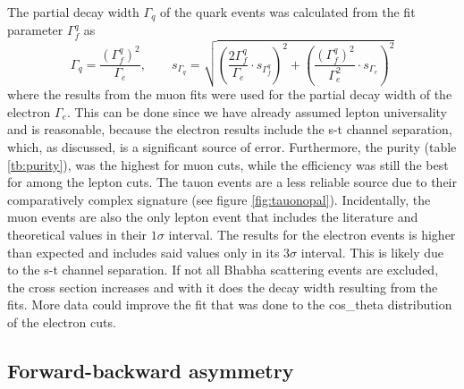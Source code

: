 The partial decay width $\Gamma_q$ of the quark events was calculated from the fit parameter $\Gamma_f^q$ as
\begin{equation}
\Gamma_q=\frac{(\Gamma_{f}^q)^2}{\Gamma_e},\qquad
s_{\Gamma_q}=\sqrt{\left(\frac{2\Gamma_f^q}{\Gamma_e}\cdot s_{\Gamma_f^q}\right)^2+\left(\frac{(\Gamma_f^q)^2}{\Gamma_e^2}\cdot s_{\Gamma_e}\right)^2}
\end{equation}
where the results from the muon fits were used for the partial decay width of the electron $\Gamma_e$. This can be done since we have already assumed lepton universality and is reasonable, because the electron results include the s-t channel separation, which, as discussed, is a significant source of error. Furthermore, the purity (table \ref{tb:purity}), was the highest for muon cuts, while the efficiency was still the best for among the lepton cuts. The tauon events are a less reliable source due to their comparatively complex signature (see figure \ref{fig:tauonopal}). 
Incidentally, the muon events are also the only lepton event that includes the literature and theoretical values in their $1\sigma$ interval. The results for the electron events is higher than expected and includes said values only in its $3\sigma$ interval. This is likely due to the s-t channel separation. If not all Bhabha scattering events are excluded, the cross section increases and with it does the decay width resulting from the fits. More data could improve the fit that was done to the cos\_theta distribution of the electron cuts. 

\subsection{Forward-backward asymmetry}


